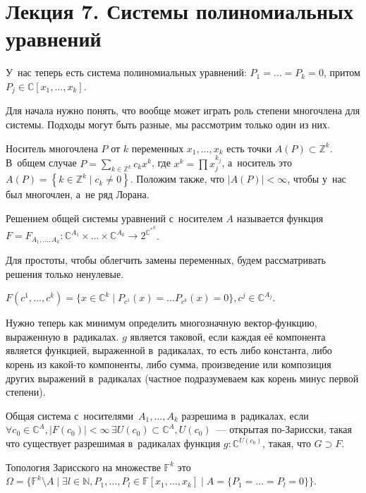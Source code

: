 \documentclass{article}
\begin{document}
\section*{Лекция 7. Системы полиномиальных уравнений}

У~нас теперь есть система полиномиальных уравнений: $P_1 = \ldots = P_k = 0$,
притом $P_j \in \mathbb{C}[x_1, \ldots, x_k]$.

Для начала нужно понять, что вообще может играть роль степени многочлена для
системы. Подходы могут быть разные, мы рассмотрим только один из них.

Носитель многочлена $P$ от $k$ переменных $x_1, \ldots, x_k$ есть точки $A(P)
\subset \mathbb{Z}^k$. В~общем случае $P = \sum_{k \in \mathbb{Z}^k} c_k x^k$,
где $x^k = \prod x_j^{k_j}$, а~носитель это $A(P) = \left\{k \in \mathbb{Z}^k
\mid c_k \ne 0\right\}$. Положим также, что $|A(P)| < \infty$, чтобы у~нас был
многочлен, а~не ряд Лорана.

\begin{definition}
	Решением общей системы уравнений с~носителем $A$ называется функция $F =
	F_{A_1, \ldots, A_k}: \mathbb{C}^{A_1} \times \ldots \times
	{\mathbb{C}}^{A_k} \rightarrow 2^{{\mathbb{C}^\ast}^k}$.

	Для простоты, чтобы облегчить замены переменных, будем рассматривать решения
	только ненулевые.

	$F(c^1, \ldots, c^k) = \{x \in \mathbb{C}^k \mid P_{c^1}(x) = \ldots
	P_{c^k}(x) = 0\}, c^j \in \mathbb{C}^{A_j}$.
\end{definition}

\begin{definition}
	Нужно теперь как минимум определить многозначную вектор-функцию, выраженную
	в~радикалах. $g$ является таковой, если каждая её компонента является функцией,
	выраженной в~радикалах, то есть либо константа, либо корень из какой-то
	компоненты, либо сумма, произведение или композиция других выражений
	в~радикалах (частное подразумеваем как корень минус первой степени).

	Общая система с~носителями~$A_1, \ldots, A_k$ разрешима в~радикалах, если
	$\forall c_0 \in \mathbb{C}^A, |F(c_0)| < \infty\,\exists U(c_0) \subset
	\mathbb{C}^A, U(c_0)$~--- открытая по-Зарисски, такая что
	существует разрешимая в~радикалах функция $g: \mathbb{C}^{U(c_0)}$, такая,
	что $G \supset F$.
\end{definition}

\begin{remark}
	Топология Зарисского на множестве $\mathbb{F}^k$ это $\Omega = \{\mathbb{F}^k
	\setminus A \mid \exists l \in \mathbb{N}, P_1, \ldots, P_l \in
	\mathbb{F}[x_1, \ldots, x_k] \mid A = \{P_1 = \ldots = P_l = 0\}\}$.
\end{remark}
\end{document}
